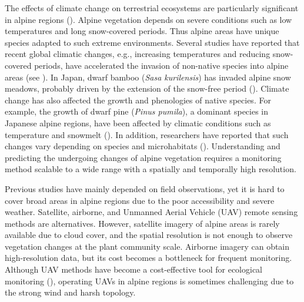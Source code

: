 \documentclass{article}
\begin{document}
The effects of climate change on terrestrial ecosystems are particularly significant in alpine regions (\cite{IPCC2007}). Alpine vegetation depends on severe conditions such as low temperatures and long snow-covered periods. Thus alpine areas have unique species adapted to such extreme environments. Several studies have reported that recent global climatic changes, e.g., increasing temperatures and reducing snow-covered periods, have accelerated the invasion of non-native species into alpine areas (see \cite{Alexander2016AlpBotany}). In Japan, dwarf bamboo (\emph{Sasa kurilensis}) has invaded alpine snow meadows, probably driven by the extension of the snow-free period (\cite{Kudo2011EcoEvo}). Climate change has also affected the growth and phenologies of native species. For example, the growth of dwarf pine (\emph{Pinus pumila}), a dominant species in Japanese alpine regions, have been affected by climatic conditions such as temperature and snowmelt (\cite{Amagai2015EcoRes}). In addition, researchers have reported that such changes vary depending on species and microhabitats (\cite{Kudo2010AAA}). Understanding and predicting the undergoing changes of alpine vegetation requires a monitoring method scalable to a wide range with a spatially and temporally high resolution.

Previous studies have mainly depended on field observations, yet it is hard to cover broad areas in alpine regions due to the poor accessibility and severe weather. Satellite, airborne, and Unmanned Aerial Vehicle (UAV) remote sensing methods are alternatives. However, satellite imagery of alpine areas is rarely available due to cloud cover, and the spatial resolution is not enough to observe vegetation changes at the plant community scale. Airborne imagery can obtain high-resolution data, but its cost becomes a bottleneck for frequent monitoring. Although UAV methods have become a cost-effective tool for ecological monitoring (\cite{Baena2017PLOSONE}), operating UAVs in alpine regions is sometimes challenging due to the strong wind and harsh topology.
\end{document}
